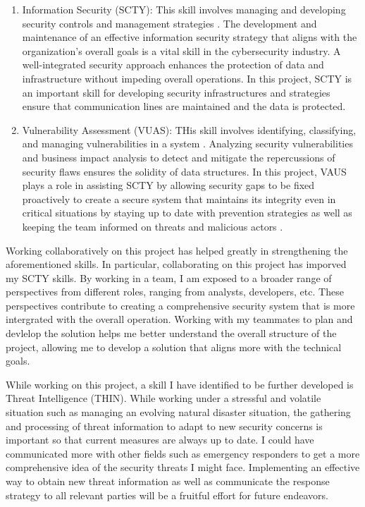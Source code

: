 \documentclass[a4paper, 11pt]{report}
\begin{document}
\begin{enumerate}

	\item Information Security (SCTY): This skill involves managing and developing security controls and management strategies \cite{scty}. The development and maintenance of an effective information security strategy that aligns with the organization's overall goals is a vital skill in the cybersecurity industry. A well-integrated security approach enhances the protection of data and infrastructure without impeding overall operations. In this project, SCTY is an important skill for developing security infrastructures and strategies ensure that communication lines are maintained and the data is protected.

	\item Vulnerability Assessment (VUAS): THis skill involves identifying, classifying, and managing vulnerabilities in a system \cite{vuas}. Analyzing security vulnerabilities and business impact analysis to detect and mitigate the repercussions of security flaws ensures the solidity of data structures. In this project, VAUS plays a role in assisting SCTY by allowing security gaps to be fixed proactively to create a secure system that maintains its integrity even in critical situations by staying up to date with prevention strategies as well as keeping the team informed on threats and malicious actors \cite{papatsaroucha2021}.
\end{enumerate}

Working collaboratively on this project has helped greatly in strengthening the aforementioned skills. In particular, collaborating on this project has imporved my SCTY skills. By working in a team, I am exposed to a broader range of perspectives from different roles, ranging from analysts, developers, etc. These perspectives contribute to creating a comprehensive security system that is more intergrated with the overall operation. Working with my teammates to plan and devlelop the solution helps me better understand the overall structure of the project, allowing me to develop a solution that aligns more with the technical goals.

While working on this project, a skill I have identified to be further developed is Threat Intelligence (THIN). While working under a stressful and volatile situation such as managing an evolving natural disaster situation, the gathering and processing of threat information to adapt to new security concerns is important so that current measures are always up to date. I could have communicated more with other fields such as emergency responders to get a more comprehensive idea of the security threats I might face. Implementing an effective way to obtain new threat information as well as communicate the response strategy to all relevant parties will be a fruitful effort for future endeavors.
\end{document}
